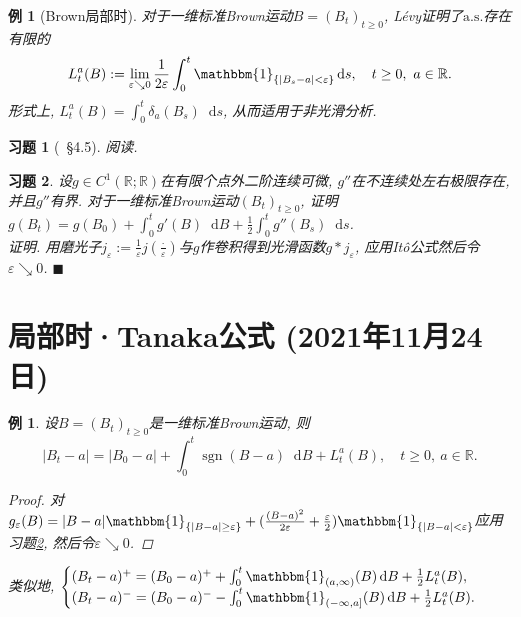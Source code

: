 \documentclass{ctexart}
\theoremstyle{definition}
\theoremstyle{remark}
\theoremstyle{plain}
\newtheorem{Eg}[Def]{例}
\newtheorem{Ex}{习题}[section]
\newenvironment{Prf}{\vspace{1ex}\textbf{\\}{\color{red}\textit{证明}}.\normalfont}{\color{red}\hfill$\blacksquare$\vspace{1ex}\par}
\newcommand{\1}{\mathbbm{1}}				%
\newcommand{\as}{\mathrm{a.s.}}				%
\newcommand{\sgn}[1]{\operatorname{sgn}(#1)}	%
\newcommand{\abs}[1]{\lvert#1\rvert}			%
\newcommand{\R}{\mathbb{R}}					%
\newcommand{\tint}{\textstyle\int\nolimits}
\renewcommand*{\d}{\mathop{}\!\mathrm{d}}	%
\begin{document}
\begin{Eg}[Brown局部时]
对于一维标准Brown运动$B = (B_{t})_{t \ge 0}$, L\'{e}vy证明了$\as$存在有限的
\[ L^{a}_{t}(B) := \lim_{\varepsilon \searrow 0} \frac{1}{2\varepsilon} \int_{0}^{t} \1_{\{ \abs{B_{s}-a} < \varepsilon \}} \d s , \quad t \ge 0 ,\ a \in \R . \]
形式上, $L^{a}_{t}(B) = \int_{0}^{t} \delta_{a}(B_{s}) \d s$, 从而适用于非光滑分析.
\end{Eg}


\begin{Ex}[\cite{龚光鲁-钱敏平}~\S4.5]
阅读.
\end{Ex}


\begin{Ex}\label{Ex:Ito_C1}
设$g \in C^{1}(\R;\R)$在有限个点外二阶连续可微, $g''$在不连续处左右极限存在, 并且$g''$有界. 对于一维标准Brown运动$(B_{t})_{t \ge 0}$, 证明$g(B_{t}) = g(B_{0}) + \int_{0}^{t} g'(B) \d B + \frac{1}{2}\int_{0}^{t} g''(B_{s}) \d s$.
\begin{Prf}
用磨光子$j_{\varepsilon} := \frac{1}{\varepsilon}j(\frac{\bm{\cdot}}{\varepsilon})$与$g$作卷积得到光滑函数$g * j_{\varepsilon}$, 应用It\^{o}公式然后令$\varepsilon \searrow 0$.
\end{Prf}
\end{Ex}



\section{局部时·Tanaka公式 \normalfont\footnotesize (2021年11月24日)}
\begin{Eg}
设$B = (B_{t})_{t \ge 0}$是一维标准Brown运动, 则
\[ \abs{B_{t}-a} = \abs{B_{0}-a} + \tint_{0}^{t} \sgn{B-a} \d B + L_{t}^{a}(B) ,\quad  t \ge 0 ,\ a \in \R . \]
\begin{proof}
对$g_{\varepsilon}(B) = \abs{B-a}\1_{\{\abs{B-a}\ge\varepsilon\}} + (\frac{(B-a)^2}{2\varepsilon}+\frac{\varepsilon}{2})\1_{\{\abs{B-a}<\varepsilon\}}$应用习题\ref{Ex:Ito_C1}, 然后令$\varepsilon \searrow 0$.
\end{proof}
\noindent 类似地, $\begin{cases}
(B_{t}-a)^{+} = (B_{0}-a)^{+} + \tint_{0}^{t} \1_{(a,\infty)}(B) \d B + \frac{1}{2} L_{t}^{a}(B) , \\
(B_{t}-a)^{-} = (B_{0}-a)^{-} - \tint_{0}^{t} \1_{(-\infty,a]}(B) \d B + \frac{1}{2} L_{t}^{a}(B) . 
\end{cases}$
\end{Eg}
\end{document}
